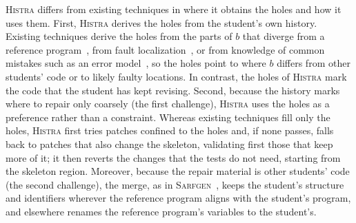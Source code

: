\documentclass[10pt,conference]{IEEEtran}
\begin{document}
\textsc{Histra} differs from existing techniques in where it obtains the holes and how it uses them. First, \textsc{Histra} derives the holes from the student's own history. Existing techniques derive the holes from the parts of $b$ that diverge from a reference program~\cite{gulwani2018automated, wang2018search, hu2019re}, from fault localization~\cite{xie2024brafar, orvalho2025counterexample}, or from knowledge of common mistakes such as an error model~\cite{singh2013automated}, so the holes point to where $b$ differs from other students' code or to likely faulty locations. In contrast, the holes of \textsc{Histra} mark the code that the student has kept revising. Second, because the history marks where to repair only coarsely (the first challenge), \textsc{Histra} uses the holes as a preference rather than a constraint. Whereas existing techniques fill only the holes, \textsc{Histra} first tries patches confined to the holes and, if none passes, falls back to patches that also change the skeleton, validating first those that keep more of it; it then reverts the changes that the tests do not need, starting from the skeleton region. Moreover, because the repair material is other students' code (the second challenge), the merge, as in \textsc{Sarfgen}~\cite{wang2018search}, keeps the student's structure and identifiers wherever the reference program aligns with the student's program, and elsewhere renames the reference program's variables to the student's.
\end{document}
